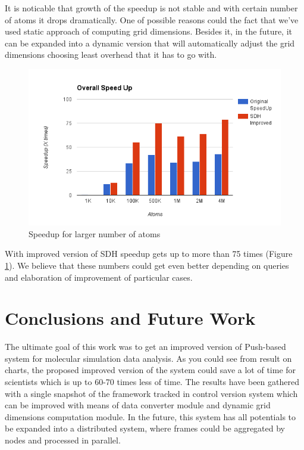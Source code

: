 \documentclass[12pt,letterpaper]{report}
\begin{document}
\hspace{3em} It is noticable that growth of the speedup is not stable and with certain number of atoms it drops dramatically. One of possible reasons could the fact that we've used static approach of computing grid dimensions. Besides it, in the future, it can be expanded into a dynamic version that will automatically adjust the grid dimensions choosing least overhead that it has to go with.

\begin{figure}
 \centerline{\includegraphics[width=0.8\columnwidth]{images/overall_speedup}}
 \caption{Speedup for larger number of atoms}
 \label{fg:chart_max}
\end{figure}

With improved version of SDH speedup gets up to more than 75 times (Figure \ref{fg:chart_max}). We believe that these numbers could get even better depending on queries and elaboration of improvement of particular cases.

\chapter{Conclusions and Future Work}\label{sc:conclusion}
\hspace{3em} The ultimate goal of this work was to get an improved version of Push-based system for molecular simulation data analysis. As you could see from result on charts, the proposed improved version of the system could save a lot of time for scientists which is up to 60-70 times less of time. The results have been gathered with a single snapshot of the framework tracked in control version system which can be improved with means of data converter module and dynamic grid dimensions computation module. In the future, this system has all potentials to be expanded into a distributed system, where frames could be aggregated by nodes and processed in parallel.\\

%


\end{document}
